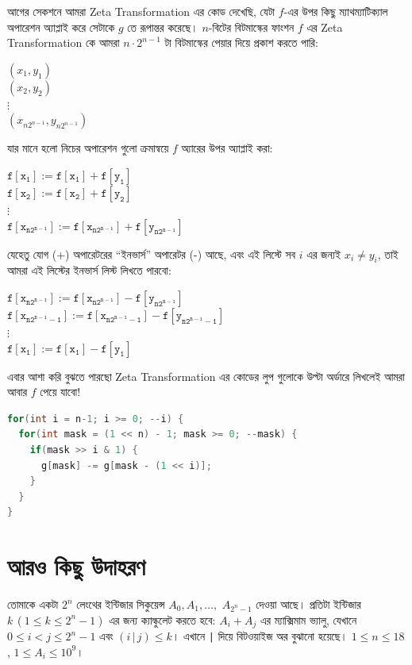আগের সেকশনে আমরা Zeta Transformation এর কোড দেখেছি, যেটা $f$-এর উপর কিছু
ম্যাথম্যাটিক্যাল অপারেশন অ্যাপ্লাই করে সেটাকে $g$ তে রূপান্তর করেছে।
$n$-বিটের বিটমাস্কের ফাংশন $f$ এর Zeta Transformation কে আমরা $n \cdot
2^{n-1}$ টা বিটমাস্কের পেয়ার দিয়ে প্রকাশ করতে পারি:
\begin{center}
  $(x_1, y_1)$\\
  $(x_2, y_2)$\\
  $\vdots$\\
  $(x_{n 2^{n-1}}, y_{n 2^{n-1}})$
\end{center}
যার মানে হলো নিচের অপারেশন গুলো ক্রমান্বয়ে $f$ অ্যারের উপর অ্যাপ্লাই করা:
\begin{center}
  $\mathtt{f[x_1] := f[x_1] + f[y_1]}$\\
  $\mathtt{f[x_2] := f[x_2] + f[y_2]}$\\
  $\vdots$\\
  $\mathtt{f[x_{n 2^{n-1}}] := f[x_{n 2^{n-1}}] + f[y_{n 2^{n-1}}]}$
\end{center}
যেহেতু যোগ (+) অপারেটরের ``ইনভার্স'' অপারেটর (-) আছে, এবং এই লিস্টে সব $i$ এর
জন্যই $x_i \ne y_i$, তাই আমরা এই লিস্টের ইনভার্স লিস্ট লিখতে পারবো:
\begin{center}
  $\mathtt{f[x_{n 2^{n-1}}] := f[x_{n 2^{n-1}}] - f[y_{n 2^{n-1}}]}$\\
  $\mathtt{f[x_{n 2^{n-1} - 1}] := f[x_{n 2^{n-1} - 1}] - f[y_{n 2^{n-1} -
  1}]}$\\
  $\vdots$\\
  $\mathtt{f[x_1] := f[x_1] - f[y_1]}$
\end{center}
এবার আশা করি বুঝতে পারছো Zeta Transformation এর কোডের লুপ গুলোকে উল্টা
অর্ডারে লিখলেই আমরা আবার $f$ পেয়ে যাবো!
\begin{lstlisting}[language=C++]
for(int i = n-1; i >= 0; --i) {
  for(int mask = (1 << n) - 1; mask >= 0; --mask) {
    if(mask >> i & 1) {
      g[mask] -= g[mask - (1 << i)];
    }
  }
}
\end{lstlisting}

\section{আরও কিছু উদাহরণ}

\begin{example}
  তোমাকে একটা $2^n$ লেংথের ইন্টিজার সিকুয়েন্স $A_0, A_1, \ldots,$ $A_{2^n-1}$
  দেওয়া আছে। প্রতিটা ইন্টিজার $k \, (1 \le k \le 2^n-1)$ এর জন্য ক্যাল্কুলেট
  করতে হবে: $A_i + A_j$ এর ম্যাক্সিমাম ভ্যালু, যেখানে $0 \le i < j \le 2^n-1$
  এবং $(i \, \texttt{|} \, j) \le k$। এখানে \texttt{|} দিয়ে বিটওয়াইজ অর
  বুঝানো হয়েছে। $1 \le n \le 18$, $1 \le A_i \le 10^9$।
\end{example}

